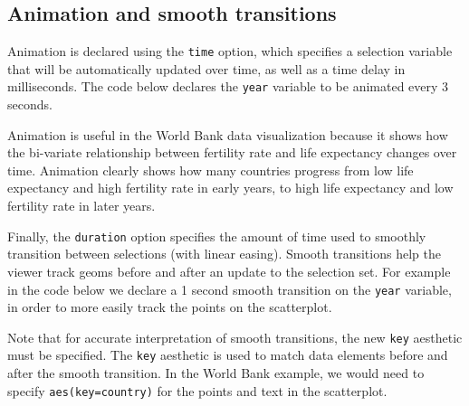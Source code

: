 \documentclass[12pt,]{article}
\newenvironment{Shaded}{\begin{snugshade}}{\end{snugshade}}
\newcommand{\DataTypeTok}[1]{\textcolor[rgb]{0.13,0.29,0.53}{#1}}
\newcommand{\DecValTok}[1]{\textcolor[rgb]{0.00,0.00,0.81}{#1}}
\newcommand{\KeywordTok}[1]{\textcolor[rgb]{0.13,0.29,0.53}{\textbf{#1}}}
\newcommand{\NormalTok}[1]{#1}
\newcommand{\OperatorTok}[1]{\textcolor[rgb]{0.81,0.36,0.00}{\textbf{#1}}}
\newcommand{\StringTok}[1]{\textcolor[rgb]{0.31,0.60,0.02}{#1}}
\theoremstyle{definition}
\theoremstyle{definition}
\theoremstyle{definition}
\theoremstyle{remark}
\begin{document}
\hypertarget{animation}{%
\subsection{Animation and smooth transitions}\label{animation}}

Animation is declared using the \texttt{time} option, which specifies a
selection variable that will be automatically updated over time, as well
as a time delay in milliseconds. The code below declares the
\texttt{year} variable to be animated every 3 seconds.

\begin{Shaded}
\end{Shaded}

Animation is useful in the World Bank data visualization because it
shows how the bi-variate relationship between fertility rate and life
expectancy changes over time. Animation clearly shows how many countries
progress from low life expectancy and high fertility rate in early
years, to high life expectancy and low fertility rate in later years.

Finally, the \texttt{duration} option specifies the amount of time used
to smoothly transition between selections (with linear easing). Smooth
transitions help the viewer track geoms before and after an update to
the selection set. For example in the code below we declare a 1 second
smooth transition on the \texttt{year} variable, in order to more easily
track the points on the scatterplot.

\begin{Shaded}
\end{Shaded}

Note that for accurate interpretation of smooth transitions, the new
\texttt{key} aesthetic must be specified. The \texttt{key} aesthetic is
used to match data elements before and after the smooth transition. In
the World Bank example, we would need to specify
\texttt{aes(key=country)} for the points and text in the scatterplot.
\end{document}

